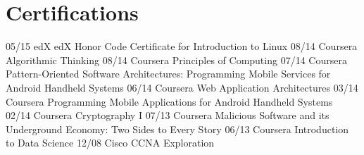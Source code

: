 \documentclass[]{friggeri-cv}
\begin{document}

\section{Certifications}
\begin{entrylist}
  \entry{}
    {05/15}
    {edX}
    {edX Honor Code Certificate for Introduction to Linux}
  \entry{}
    {08/14}
    {Coursera}
    {Algorithmic Thinking}
  \entry{}
    {08/14}
    {Coursera}
    {Principles of Computing}
  \entry{}
    {07/14}
    {Coursera}
    {Pattern-Oriented Software Architectures: Programming Mobile Services for Android Handheld Systems}
  \entry{}
    {06/14}
    {Coursera}
    {Web Application Architectures}
  \entry{}
    {03/14}
    {Coursera}
    {Programming Mobile Applications for Android Handheld Systems}
  \entry{}
    {02/14}
    {Coursera}
    {Cryptography I}
  \entry{}
    {07/13}
    {Coursera}
    {Malicious Software and its Underground Economy: Two Sides to Every Story}
  \entry{}
    {06/13}
    {Coursera}
    {Introduction to Data Science}
  \entry{}
    {12/08}
    {Cisco}
    {CCNA Exploration}
\end{entrylist}
\newpage
\end{document}

